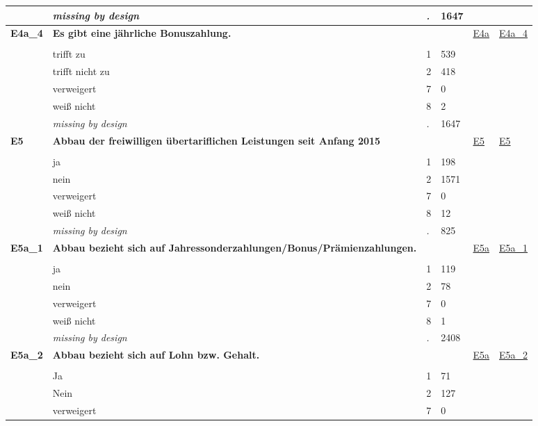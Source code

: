 \begin{longtable}{| L{2.45cm} | L{6cm} | C{1.5cm} | R{1cm} | C{2.25cm} | C{2.25cm} |}
   & \textit{missing by design} & \textit{.} & 1647 &  &  \\ 
   \midrule
\textbf{E4a\_4}\label{var:E4a:4} & \textbf{Es gibt eine jährliche Bonuszahlung.} &  &  & \hyperref[E4a]{E4a} & \hyperref[var:suf:E4a:4]{E4a\_4} \\ 
   &  &  &  &  &  \\ 
   & trifft zu & 1 & 539 &  &  \\ 
   & trifft nicht zu & 2 & 418 &  &  \\ 
   & verweigert & 7 & 0 &  &  \\ 
   & weiß nicht & 8 & 2 &  &  \\ 
   & \textit{missing by design} & \textit{.} & 1647 &  &  \\ 
   \midrule
\textbf{E5}\label{var:E5} & \textbf{Abbau der freiwilligen übertariflichen Leistungen seit Anfang 2015} &  &  & \hyperref[E5]{E5} & \hyperref[var:suf:E5]{E5} \\ 
   &  &  &  &  &  \\ 
   & ja & 1 & 198 &  &  \\ 
   & nein & 2 & 1571 &  &  \\ 
   & verweigert & 7 & 0 &  &  \\ 
   & weiß nicht & 8 & 12 &  &  \\ 
   & \textit{missing by design} & \textit{.} & 825 &  &  \\ 
   \midrule
\textbf{E5a\_1}\label{var:E5a:1} & \textbf{Abbau bezieht sich auf Jahressonderzahlungen/Bonus/Prämienzahlungen.} &  &  & \hyperref[E5a]{E5a} & \hyperref[var:suf:E5a:1]{E5a\_1} \\ 
   &  &  &  &  &  \\ 
   & ja & 1 & 119 &  &  \\ 
   & nein & 2 & 78 &  &  \\ 
   & verweigert & 7 & 0 &  &  \\ 
   & weiß nicht & 8 & 1 &  &  \\ 
   & \textit{missing by design} & \textit{.} & 2408 &  &  \\ 
   \midrule
\textbf{E5a\_2}\label{var:E5a:2} & \textbf{Abbau bezieht sich auf Lohn bzw. Gehalt.} &  &  & \hyperref[E5a]{E5a} & \hyperref[var:suf:E5a:2]{E5a\_2} \\ 
   &  &  &  &  &  \\ 
   & Ja & 1 & 71 &  &  \\ 
   & Nein & 2 & 127 &  &  \\ 
   & verweigert & 7 & 0 &  &  \\ 

\end{longtable}
